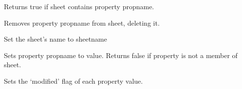 
Returns true if sheet contains property propname.

\label{wxpropertysheetremoveproperty}


Removes property propname from sheet, deleting it.

\label{wxpropertysheetsetname}


Set the sheet's name to sheetname

\label{wxpropertysheetsetproperty}


Sets property propname to value. Returns false if property is not a member of sheet.



Sets the `modified' flag of each property value.



